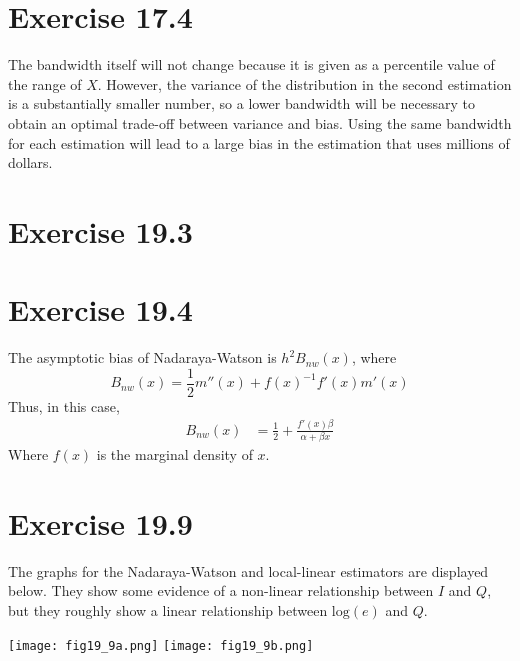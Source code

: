 \documentclass{article}
\newcommand{\loge}[1]{\text{log}\left(#1\right)}
\begin{document}

\section*{Exercise 17.4}
The bandwidth itself will not change because it is given as a percentile value of the range of $X$. However, the variance of the distribution in the second estimation is a substantially smaller number, so a lower bandwidth will be necessary to obtain an optimal trade-off between variance and bias. Using the same bandwidth for each estimation will lead to a large bias in the estimation that uses millions of dollars.


\section*{Exercise 19.3}




\section*{Exercise 19.4}
The asymptotic bias of Nadaraya-Watson is $h^2B_{nw}(x)$, where $$ B_{nw}(x) = \frac{1}{2}m''(x) + f(x)^{-1}f'(x)m'(x) $$ Thus, in this case,
\begin{align*}
	B_{nw}(x) &= \frac{1}{2} + \frac{f'(x)\beta}{\alpha + \beta x}
\end{align*}
Where $f(x)$ is the marginal density of $x$. 


\section*{Exercise 19.9}
The graphs for the Nadaraya-Watson and local-linear estimators are displayed below. They show some evidence of a non-linear relationship between $I$ and $Q$, but they roughly show a linear relationship between $\loge{e}$ and $Q$.
\begin{center}
	\texttt{[image: fig19\_9a.png]}
	\texttt{[image: fig19\_9b.png]}
\end{center}
\end{document}
